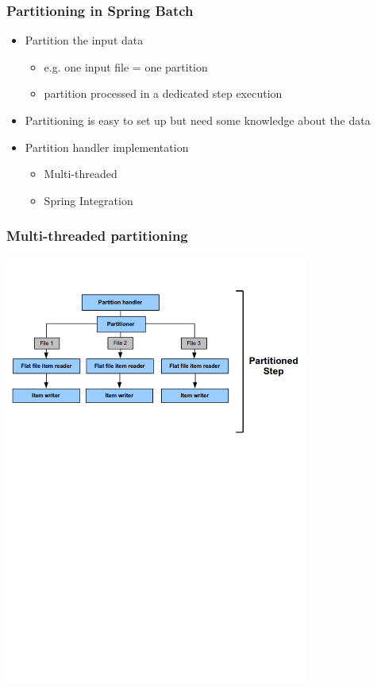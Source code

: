 \begin{frame}
 \frametitle{Partitioning in Spring Batch}
 \begin{itemize}
  \item Partition the input data
  \begin{itemize}
    \item e.g. one input file = one partition
    \item partition processed in a dedicated step execution
  \end{itemize}
  \item Partitioning is easy to set up but need some knowledge about the data
  \item Partition handler implementation
  \begin{itemize}
   \item Multi-threaded
   \item Spring Integration  
  \end{itemize}
 \end{itemize}
\end{frame}

\begin{frame}
 \frametitle{Multi-threaded partitioning}
 \begin{center}
  \includegraphics[width=10cm]{figures/input-files-partitioning.pdf}  
 \end{center}
\end{frame}

